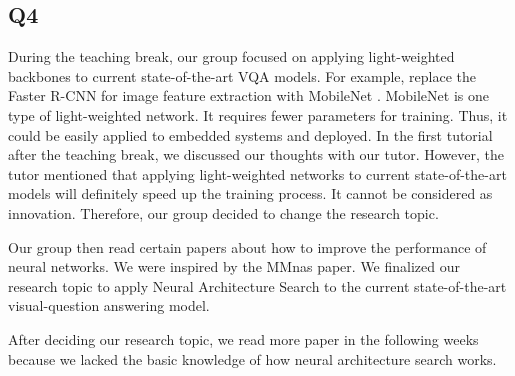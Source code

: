 \documentclass[12pt, a4paper]{article}
\begin{document}
\subsection*{Q4}
\par\noindent \newline During the teaching break, our group focused on applying light-weighted backbones to current state-of-the-art VQA models. For example, replace the Faster R-CNN \cite{DBLP:journals/corr/RenHG015} for image feature extraction with MobileNet \cite{DBLP:journals/corr/HowardZCKWWAA17}. MobileNet \cite{DBLP:journals/corr/HowardZCKWWAA17} is one type of light-weighted network. It requires fewer parameters for training. Thus, it could be easily applied to embedded systems and deployed. In the first tutorial after the teaching break, we discussed our thoughts with our tutor. However, the tutor mentioned that applying light-weighted networks to current state-of-the-art models will definitely speed up the training process. It cannot be considered as innovation. Therefore, our group decided to change the research topic.

\par\noindent \newline Our group then read certain papers about how to improve the performance of neural networks. We were inspired by the MMnas paper. We finalized our research topic to apply Neural Architecture Search to the current state-of-the-art visual-question answering model. 

\par\noindent \newline After deciding our research topic, we read more paper in the following weeks because we lacked the basic knowledge of how neural architecture search works. 
\end{document}

